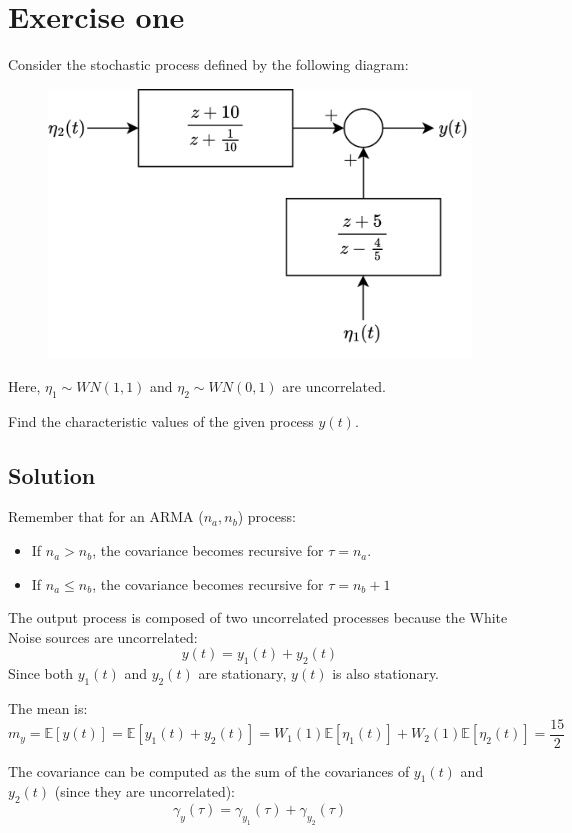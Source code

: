 \section{Exercise one}

Consider the stochastic process defined by the following diagram:
\begin{figure}[H]
    \centering
    \includegraphics[width=0.5\linewidth]{images/block.png}
\end{figure}
Here, $\eta_1 \sim WN(1,1)$ and $\eta_2 \sim WN(0,1)$ are uncorrelated. 

Find the characteristic values of the given process $y(t)$.

\subsection*{Solution}
Remember that for an ARMA ($n_a,n_b$) process:
\begin{itemize}
    \item If $n_a>n_b$, the covariance becomes recursive for $\tau=n_a$.
    \item If $n_a \leq n_b$, the covariance becomes recursive for $\tau=n_b+1$
\end{itemize}

The output process is composed of two uncorrelated processes because the White Noise sources are uncorrelated:
\[y(t)=y_1(t)+y_2(t)\]
Since both $y_1(t)$ and $y_2(t)$ are stationary, $y(t)$ is also stationary.

The mean is: 
\[m_y=\mathbb{E}\left[y(t)\right]=\mathbb{E}\left[y_1(t)+y_2(t)\right]=W_1(1)\mathbb{E}\left[\eta_1(t)\right]+W_2(1)\mathbb{E}\left[\eta_2(t)\right]=\dfrac{15}{2}\]

The covariance can be computed as the sum of the covariances of $y_1(t)$ and $y_2(t)$ (since they are uncorrelated):
\[\gamma_y(\tau)=\gamma_{y_1}(\tau)+\gamma_{y_2}(\tau)\]

